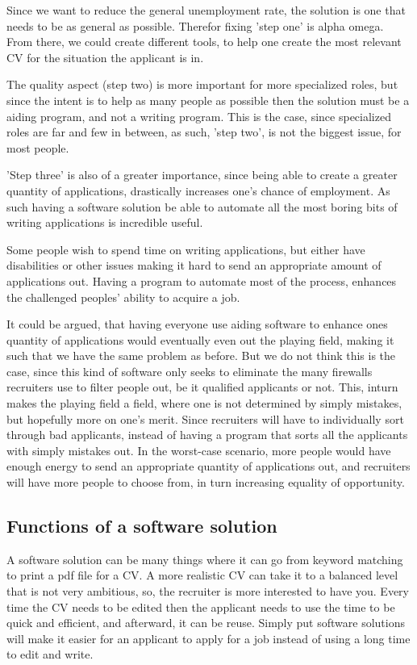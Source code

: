 Since we want to reduce the general unemployment rate, the solution is one that needs to 
be as general as possible. Therefor fixing 'step one' is alpha omega.
From there, we could create different tools, to help one create the most relevant
CV for the situation the applicant is in.

The quality aspect (step two) is more important for more specialized roles, 
but since the intent is to help as many people as possible then the solution
must be a aiding program, and not a writing program.
This is the case, since specialized roles are far and few in between,
as such, 'step two', is not the biggest issue, for most people. 

'Step three' is also of a greater importance, since being able to create a
greater quantity of applications, drastically increases one's chance of
employment. 
As such having a software solution be able to automate all the most boring
bits of writing applications is incredible useful.

Some people wish to spend time on writing applications, but either have
disabilities or other issues making it hard to send an appropriate amount
of applications out. Having a program to automate most of the process, enhances
the challenged peoples' ability to acquire a job.

It could be argued, that having everyone use aiding software to enhance ones
quantity of applications would eventually even out the playing field, making
it such that we have the same problem as before. 
But we do not think this is the case, since this kind of software only seeks
to eliminate the many firewalls recruiters use to filter people out, be it 
qualified applicants or not.
This, inturn makes the playing field a field, where one is not determined by
simply mistakes, but hopefully more on one's merit. Since recruiters will have to 
individually sort through bad applicants, instead of having a program that sorts
all the applicants with simply mistakes out. In the worst-case scenario, more
people would have enough energy to send an appropriate quantity of applications
out, and recruiters will have more people to choose from, in turn increasing
equality of opportunity.

\subsection{Functions of a software solution}
A software solution can be many things where it can go from keyword matching to print a pdf file for a CV.
A more realistic CV can take it to a balanced level that is not very ambitious, 
so, the recruiter is more interested to have you. Every time the CV needs to be edited
then the applicant needs to use the time to be quick and efficient, and afterward, it can be reuse.
Simply put software solutions will make it easier for an applicant to apply for a job instead of using a long time to edit and write. \\


